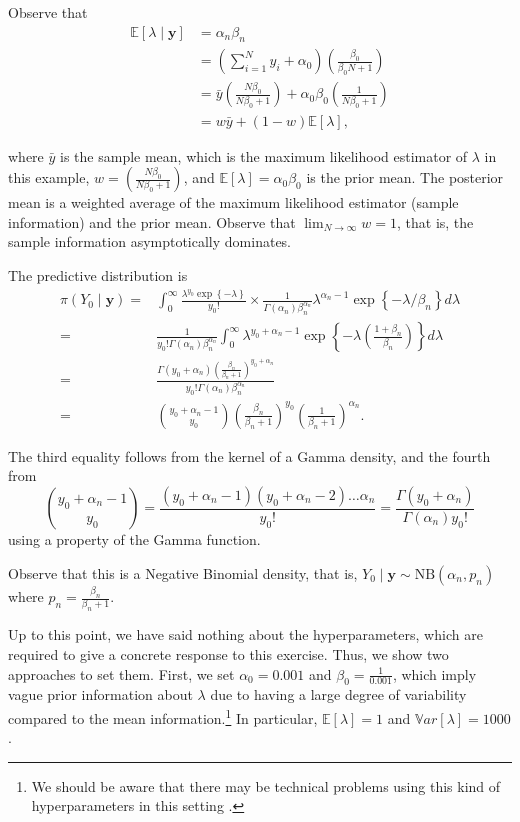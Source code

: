 Observe that 
\begin{align*}
	\mathbb{E}[\lambda\mid \mathbf{y}]&=\alpha_n\beta_n\\
	&=\left(\sum_{i=1}^N y_i + \alpha_0\right)\left(\frac{\beta_0}{\beta_0 N + 1}\right)\\
	&=\bar{y}\left(\frac{N\beta_0}{N\beta_0+1}\right)+\alpha_0\beta_0\left(\frac{1}{N\beta_0+1}\right)\\
	&=w\bar{y}+(1-w)\mathbb{E}[\lambda],
\end{align*}

where \( \bar{y} \) is the sample mean, which is the maximum likelihood estimator of \( \lambda \) in this example, \( w = \left(\frac{N\beta_0}{N\beta_0 + 1}\right) \), and \( \mathbb{E}[\lambda] = \alpha_0 \beta_0 \) is the prior mean. The posterior mean is a weighted average of the maximum likelihood estimator (sample information) and the prior mean. Observe that \( \lim_{N \to \infty} w = 1 \), that is, the sample information asymptotically dominates.

The predictive distribution is
\begin{align*}
	\pi(Y_0\mid \mathbf{y})=&\int_{0}^{\infty}\frac{\lambda^{y_0}\exp\left\{-\lambda\right\}}{y_0!}\times \frac{1}{\Gamma(\alpha_n)\beta_n^{\alpha_n}}\lambda^{\alpha_n-1}\exp\left\{-\lambda/\beta_n\right\} d\lambda\\
	=&\frac{1}{y_0!\Gamma(\alpha_n)\beta_n^{\alpha_n}}\int_{0}^{\infty}\lambda^{y_0+\alpha_n-1}\exp\left\{-\lambda\left(\frac{1+\beta_n}{\beta_n}\right)\right\}d\lambda\\
	=&\frac{\Gamma(y_0+\alpha_n)\left(\frac{\beta_n}{\beta_n+1}\right)^{y_0+\alpha_n}}{y_0!\Gamma(\alpha_n)\beta_n^{\alpha_n}}\\
	=&{y_0+\alpha_n-1 \choose y_0}\left(\frac{\beta_n}{\beta_n+1}\right)^{y_0}\left(\frac{1}{\beta_n+1}\right)^{\alpha_n}.
\end{align*}

The third equality follows from the kernel of a Gamma density, and the fourth from 
\[
{y_0 + \alpha_n - 1 \choose y_0} = \frac{(y_0 + \alpha_n - 1)(y_0 + \alpha_n - 2)\dots\alpha_n}{y_0!} = \frac{\Gamma(y_0 + \alpha_n)}{\Gamma(\alpha_n) y_0!}
\]
using a property of the Gamma function.

Observe that this is a Negative Binomial density, that is, \( Y_0 \mid \mathbf{y} \sim \text{NB}(\alpha_n, p_n) \) where \( p_n = \frac{\beta_n}{\beta_n + 1} \).

Up to this point, we have said nothing about the hyperparameters, which are required to give a concrete response to this exercise. Thus, we show two approaches to set them. First, we set \( \alpha_0 = 0.001 \) and \( \beta_0 = \frac{1}{0.001} \), which imply vague prior information about \( \lambda \) due to having a large degree of variability compared to the mean information.\footnote{We should be aware that there may be technical problems using this kind of hyperparameters in this setting \cite{gelman2006prior}.} In particular, \( \mathbb{E}[\lambda] = 1 \) and \( \mathbb{V}ar[\lambda] = 1000 \).

